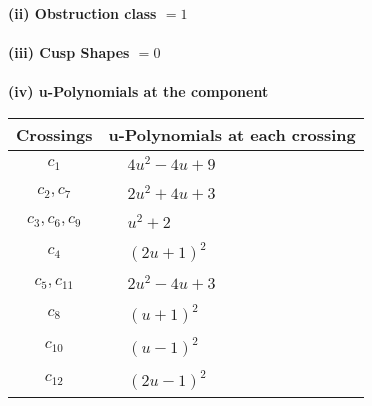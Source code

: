 \documentclass[1p]{elsarticle_modified}
\theoremstyle{definition}
\begin{document}
\flushleft \textbf{(ii) Obstruction class $= 1$}\\~\\
\flushleft \textbf{(iii) Cusp Shapes $= 0$}\\~\\
\newpage\renewcommand{\arraystretch}{1}
\flushleft \textbf{(iv) u-Polynomials at the component}\newline \\
\begin{tabular}{m{50pt}|m{274pt}}
Crossings & \hspace{64pt}u-Polynomials at each crossing \\
\hline $$\begin{aligned}c_{1}\end{aligned}$$&$\begin{aligned}
&4 u^2-4 u+9
\end{aligned}$\\
\hline $$\begin{aligned}c_{2},c_{7}\end{aligned}$$&$\begin{aligned}
&2 u^2+4 u+3
\end{aligned}$\\
\hline $$\begin{aligned}c_{3},c_{6},c_{9}\end{aligned}$$&$\begin{aligned}
&u^2+2
\end{aligned}$\\
\hline $$\begin{aligned}c_{4}\end{aligned}$$&$\begin{aligned}
&(2 u+1)^2
\end{aligned}$\\
\hline $$\begin{aligned}c_{5},c_{11}\end{aligned}$$&$\begin{aligned}
&2 u^2-4 u+3
\end{aligned}$\\
\hline $$\begin{aligned}c_{8}\end{aligned}$$&$\begin{aligned}
&(u+1)^2
\end{aligned}$\\
\hline $$\begin{aligned}c_{10}\end{aligned}$$&$\begin{aligned}
&(u-1)^2
\end{aligned}$\\
\hline $$\begin{aligned}c_{12}\end{aligned}$$&$\begin{aligned}
&(2 u-1)^2
\end{aligned}$\\
\hline
\end{tabular}\\~\\
\end{document}
